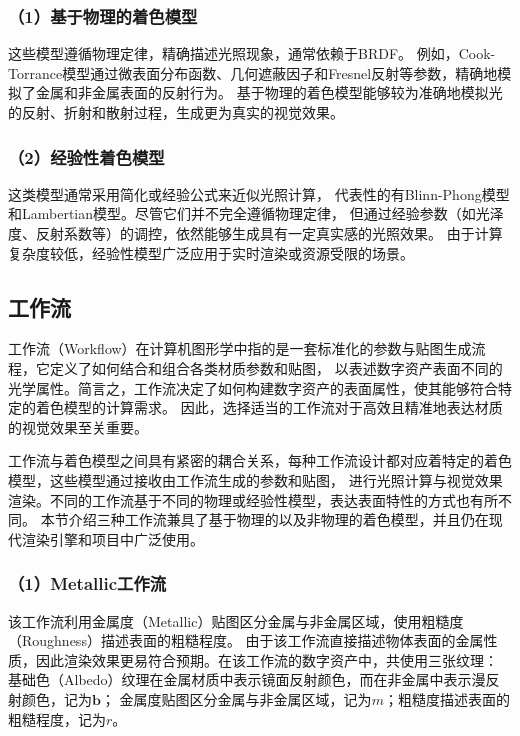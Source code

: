 \subsubsection*{（1）基于物理的着色模型}

这些模型遵循物理定律，精确描述光照现象，通常依赖于BRDF。
例如，Cook-Torrance模型\cite{Cook_1981}通过微表面分布函数、几何遮蔽因子和Fresnel反射等参数，精确地模拟了金属和非金属表面的反射行为。
基于物理的着色模型能够较为准确地模拟光的反射、折射和散射过程，生成更为真实的视觉效果。

\subsubsection*{（2）经验性着色模型}

这类模型通常采用简化或经验公式来近似光照计算，
代表性的有Blinn-Phong模型和Lambertian模型。尽管它们并不完全遵循物理定律，
但通过经验参数（如光泽度、反射系数等）的调控，依然能够生成具有一定真实感的光照效果。
由于计算复杂度较低，经验性模型广泛应用于实时渲染或资源受限的场景。

\subsection{工作流} \label{sec:workflow}
工作流（Workflow）在计算机图形学中指的是一套标准化的参数与贴图生成流程，它定义了如何结合和组合各类材质参数和贴图，
以表述数字资产表面不同的光学属性。简言之，工作流决定了如何构建数字资产的表面属性，使其能够符合特定的着色模型的计算需求。
因此，选择适当的工作流对于高效且精准地表达材质的视觉效果至关重要。

工作流与着色模型之间具有紧密的耦合关系，每种工作流设计都对应着特定的着色模型，这些模型通过接收由工作流生成的参数和贴图，
进行光照计算与视觉效果渲染。不同的工作流基于不同的物理或经验性模型，表达表面特性的方式也有所不同。
本节介绍三种工作流兼具了基于物理的以及非物理的着色模型，并且仍在现代渲染引擎和项目中广泛使用。

\subsubsection*{（1）Metallic工作流}

该工作流利用金属度（Metallic）贴图区分金属与非金属区域，使用粗糙度（Roughness）描述表面的粗糙程度。
由于该工作流直接描述物体表面的金属性质，因此渲染效果更易符合预期。在该工作流的数字资产中，共使用三张纹理：
基础色（Albedo）纹理在金属材质中表示镜面反射颜色，而在非金属中表示漫反射颜色，记为$\boldsymbol{b}$；
金属度贴图区分金属与非金属区域，记为$m$；粗糙度描述表面的粗糙程度，记为$r$。

